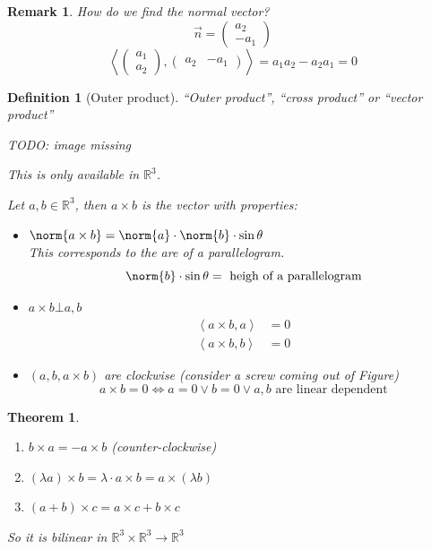 \documentclass[a4paper,landscape,twocolumn]{article}
\newcommand\functional[1]{\left\langle{#1}\right\rangle}
\newtheorem{theorem}{Theorem}
\newtheorem{defi}{Definition}
\newtheorem{rem}{Remark}
\DeclarePairedDelimiter\norm\lVert\rVert
\begin{document}
\begin{rem}
  How do we find the normal vector?
  \[ \vec{n} = \begin{pmatrix} a_2 \\ -a_1 \end{pmatrix} \]
  \[ \functional{\begin{pmatrix} a_1 \\ a_2 \end{pmatrix}, \begin{pmatrix} a_2 & -a_1 \end{pmatrix}} = a_1 a_2 - a_2 a_1 = 0 \]
\end{rem}

\begin{defi}[Outer product]
  \enquote{Outer product}, \enquote{cross product} or \enquote{vector product}

  TODO: image missing

  This is only available in $\mathbb R^3$.

  Let $a,b \in \mathbb R^3$, then $a \times b$ is the vector with properties:
  \begin{itemize}
    \item $\norm{a \times b} = \norm{a} \cdot \norm{b} \cdot \sin\theta$ \\
      This corresponds to the are of a parallelogram.
      \[ \norm{b} \cdot \sin\theta = \text{ heigh of a parallelogram} \]
    \item $a \times b \bot a,b$
      \begin{align*}
        \functional{a \times b, a} &= 0 \\
        \functional{a \times b, b} &= 0
      \end{align*}
    \item $(a,b,a\times b)$ are clockwise (consider a screw coming out of Figure)
      \[ a \times b = 0 \Leftrightarrow a = 0 \lor b = 0 \lor a,b \text{ are linear dependent} \]
  \end{itemize}
\end{defi}

\begin{theorem}
  \label{satz-8.8}
  \begin{enumerate}
    \item $b \times a = - a \times b$ (counter-clockwise)
    \item $(\lambda a) \times b = \lambda \cdot a \times b = a \times (\lambda b)$
    \item $(a + b) \times c = a \times c + b \times c$
  \end{enumerate}
  So it is bilinear in $\mathbb R^3 \times \mathbb R^3 \to \mathbb R^3$
\end{theorem}
\end{document}
